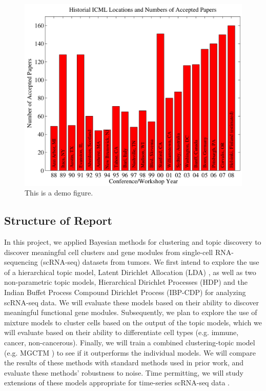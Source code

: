\documentclass{article}
\begin{document}
\begin{figure}[ht]
\vskip 0.2in
\begin{center}
\centerline{\includegraphics[width=\columnwidth]{figs/examplegraph}}
\caption{This is a demo figure.}
\label{alabel}
\end{center}
\vskip -0.2in
\end{figure} 

\subsection{Structure of Report}
In this project, we applied Bayesian methods for clustering and topic discovery to discover meaningful cell clusters and gene modules from single-cell RNA-sequencing (scRNA-seq) datasets from tumors. We first intend to explore the use of a hierarchical topic model, Latent Dirichlet Allocation (LDA) \cite{LDA}, as well as two non-parametric topic models, Hierarchical Dirichlet Processes (HDP) \cite{HDP} and the Indian Buffet Process Compound Dirichlet Process (IBP-CDP) \cite{IBP} for analyzing
scRNA-seq data. We will evaluate these models based on their ability to discover meaningful functional gene modules. Subsequently, we plan to explore the use of mixture models to cluster cells based on the output of the topic models, which we will evaluate based on their ability to differentiate cell types (e.g. immune, cancer, non-cancerous). Finally, we will train a combined clustering-topic model (e.g. MGCTM \cite{pengtao}) to see if it outperforms the individual models. We will compare the
results of these methods with standard methods used in prior work, and evaluate these methods' robustness to noise. Time permitting, we will study extensions of these models appropriate for time-series scRNA-seq data \cite{tsdpp}. \\
\end{document}
